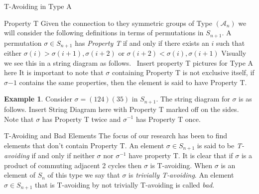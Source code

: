 \documentclass[11pt]{amsart}
\theoremstyle{definition}
\newtheorem{example}[theorem]{Example}
\numberwithin{equation}{section}
\newcommand{\A}{\mathcal{A}}
\renewcommand{\(}{\left(}
\renewcommand{\)}{\right)}
\begin{document}
\begin{section}{T-Avoiding in Type A}
\begin{subsection}{Property T}
Given the connection to they symmetric groups of Type $(\A_n)$ we will consider the following definitions in terms of permutations in $S_{n+1}$. A permutation $\sigma \in S_{n+1}$ has \emph{Property T} if and only if there exists an $i$ such that either $\sigma(i)>\sigma(i+1), \sigma(i+2)$ or $\sigma(i+2)<\sigma(i),\sigma(i+1)$ Visually we see this in a string diagram as follows.~{\color{red} Insert property T pictures for Type A here} It is important to note that $\sigma$ containing Property T is not exclusive itself, if $\sigma{-1}$ contains the same properties, then the element is said to have Property T.
\begin{example}
Consider $\sigma=(124)(35)$ in $S_{n+1}$. The string diagram for $\sigma$ is as follows. {\color{red} Insert String Diagram here with Property T marked off on the sides}. Note that $\sigma$ has Property T twice and $\sigma^{-1}$ has Property T once.	
\end{example}
\end{subsection}

\begin{subsection}{T-Avoiding and Bad Elements}
The focus of our research has been to find elements that don't contain Property T. An element $\sigma \in S_{n+1}$ is said to be \emph{T-avoiding} if and only if neither $\sigma$ nor $\sigma^{-1}$ have property T.	It is clear that if $\sigma$ is a product of commuting adjacent 2 cycles then $\sigma$ is T-avoiding. When $\sigma$ is an element of $S_n$ of this type we say that $\sigma$ is \emph{trivially T-avoiding}. An element $\sigma \in S_{n+1}$ that is T-avoiding by not trivially T-avoiding is called \emph{bad}. 
\end{subsection}


\end{section}
\end{document}
